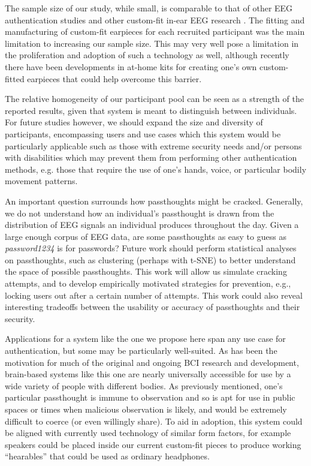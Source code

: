 \documentclass[a4paper,twoside]{article}
\begin{document}
The sample size of our study, while small, is comparable to that of other EEG authentication studies \cite{Ashby2011,Marcel2007a,Poulos2002,Chuang2013b,curran2016passthoughts} and other custom-fit in-ear EEG research \cite{Kidmose2013a,Mikkelsen2015}. The fitting and manufacturing of custom-fit earpieces for each recruited participant was the main limitation to increasing our sample size. This may very well pose a limitation in the proliferation and adoption of such a technology as well, although recently there have been developments in at-home kits for creating one's own custom-fitted earpieces \cite{voix2015settable} that could help overcome this barrier.

The relative homogeneity of our participant pool can be seen as a strength of the reported results, given that system is meant to distinguish between individuals. For future studies however, we should expand the size and diversity of participants, encompassing users and use cases which this system would be particularly applicable such as those with extreme security needs and/or persons with disabilities which may prevent them from performing other authentication methods, e.g. those that require the use of one's hands, voice, or particular bodily movement patterns.

An important question surrounds how passthoughts might be cracked. Generally, we do not understand how an individual's passthought is drawn from the distribution of EEG signals an individual produces throughout the day. Given a large enough corpus of EEG data, are some passthoughts as easy to guess as \textit{password1234} is for passwords? Future work should perform statistical analyses on passthoughts, such as clustering (perhaps with t-SNE) to better understand the space of possible passthoughts. This work will allow us simulate cracking attempts, and to develop empirically motivated strategies for prevention, e.g., locking users out after a certain number of attempts. This work could also reveal interesting tradeoffs between the usability or accuracy of passthoughts and their security.

Applications for a system like the one we propose here span any use case for authentication, but some may be particularly well-suited. As has been the motivation for much of the original and ongoing BCI research and development, brain-based systems like this one are nearly universally accessible for use by a wide variety of people with different bodies. As previously mentioned, one's particular passthought is immune to observation and so is apt for use in public spaces or times when malicious observation is likely, and would be extremely difficult to coerce (or even willingly share). To aid in adoption, this system could be aligned with currently used technology of similar form factors, for example speakers could be placed inside our current custom-fit pieces to produce working ``hearables'' that could be used as ordinary headphones.
\end{document}
